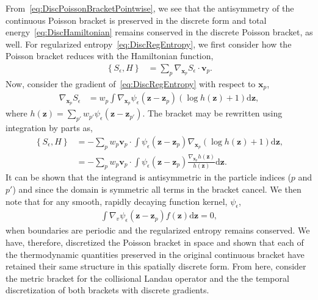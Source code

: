 \documentclass[preprint,12pt]{elsarticle}
\theoremstyle{definition}
\begin{document}
From~\eqref{eq:DiscPoissonBracketPointwise}, we see that the antisymmetry of the continuous Poisson bracket is preserved in the discrete form and total energy~\eqref{eq:DiscHamiltonian} remains conserved in the discrete Poisson bracket, as well. For regularized entropy~\eqref{eq:DiscRegEntropy}, we first consider how the Poisson bracket reduces with the Hamiltonian function,
\begin{align*}
    \left\{S_{\epsilon},H\right\} &= \sum_p \nabla_{\boldsymbol{x}_p} S_{\epsilon} \cdot \boldsymbol{v}_p.
\end{align*}
Now, consider the gradient of~\eqref{eq:DiscRegEntropy} with respect to $\boldsymbol{x}_p$,
\begin{align*}
    \nabla_{\boldsymbol{x}_p} S_{\epsilon} &= w_p \int \nabla_{\boldsymbol{x}_p} \psi_{\epsilon} (\boldsymbol{z}-\boldsymbol{z}_p) \left(\log h(\boldsymbol{z})+1\right) \mathrm{d} \boldsymbol{z},
\end{align*}
where $h(\boldsymbol{z}) = \sum_{p'} w_{p'} \psi_{\epsilon} (\boldsymbol{z} - \boldsymbol{z}_{p'})$. The bracket may be rewritten using integration by parts as,
\begin{align*}
     \left\{S_{\epsilon},H\right\} &= - \sum_p w_p \boldsymbol{v}_p \cdot \int \psi_{\epsilon} (\boldsymbol{z}-\boldsymbol{z}_p) \nabla_{\boldsymbol{x}_p} \left(\log h(\boldsymbol{z})+1\right) \mathrm{d} \boldsymbol{z},\\
     &= - \sum_p w_p \boldsymbol{v}_p \cdot \int \psi_{\epsilon} (\boldsymbol{z}-\boldsymbol{z}_p)  \frac{\nabla_{\boldsymbol{x}_p} h (\boldsymbol{z})}{h (\boldsymbol{z})} \mathrm{d} \boldsymbol{z}.
\end{align*}
It can be shown that the integrand is antisymmetric in the particle indices ($p$ and $p'$) and since the domain is symmetric all terms in the bracket cancel. We then note that for any smooth, rapidly decaying function kernel, $\psi_{\epsilon}$,
\begin{align*}
    \int \nabla_v \psi_{\epsilon} (\boldsymbol{z}-\boldsymbol{z}_p) f(\boldsymbol{z}) \mathrm{d} \boldsymbol{z} = 0,
\end{align*}
when boundaries are periodic and the regularized entropy remains conserved. We have, therefore, discretized the Poisson bracket in space and shown that each of the thermodynamic quantities preserved in the original continuous bracket have retained their same structure in this spatially discrete form. From here, consider the metric bracket for the collisional Landau operator and the the temporal discretization of both brackets with discrete gradients.
\end{document}
